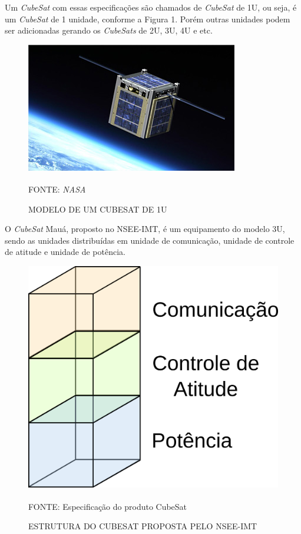\documentclass[
	12pt,				%
	openright,			%
	oneside,			%
	a4paper,			%
	english,			%
	french,				%
	spanish,			%
	brazil,				%
	oldfontcommands
	]{abntex2}
\begin{document}
	Um \textit{CubeSat} com essas especificações são chamados de \textit{CubeSat} de 1U, ou seja, é um \textit{CubeSat} de 1 unidade, conforme a Figura 1. Porém outras unidades podem ser adicionadas gerando os \textit{CubeSats} de 2U, 3U, 4U e etc.
	
	\begin{figure}[th]
		\caption{MODELO DE UM CUBESAT DE 1U}
		\centering
		\includegraphics[width=0.8\linewidth]{./figs/cubesat_01}
			
		\begin{small}
			FONTE: \textit{NASA}\textsuperscript{\cite{NASA}}
		\end{small}		
	\end{figure}
		
	O \textit{CubeSat} Mauá, proposto no NSEE-IMT, é um equipamento do modelo 3U, sendo as unidades distribuídas em unidade de comunicação, unidade de controle de atitude e unidade de potência.
	
	\begin{figure}[th]
		\caption{ESTRUTURA DO CUBESAT PROPOSTA PELO NSEE-IMT}
		\centering
		\includegraphics[width=0.4\linewidth]{./figs/cubesat_02}
			
		\begin{small}
			FONTE: Especificação do produto CubeSat\textsuperscript{\cite{Corsi}}
		\end{small}		
	\end{figure}
	\pagebreak
\end{document}
